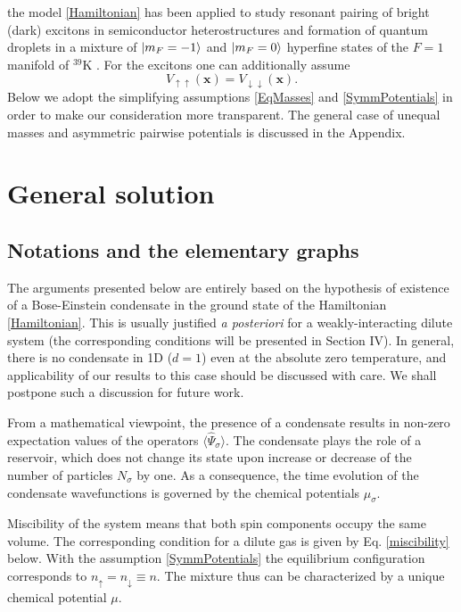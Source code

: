\documentclass[reprint,superscriptaddress,showpacs,nofootinbib,aps,pra]{revtex4-1}
\begin{document}
the model \eqref{Hamiltonian} has been applied to study resonant pairing of bright (dark) excitons in semiconductor heterostructures \cite{ResonantPairing} and formation of quantum droplets in a mixture of $\ket{m_F=-1}$ and $\ket{m_F=0}$ hyperfine states of the $F=1$ manifold of $^{39}$K \cite{Petrov2015, BoseMixture}. For the excitons one can additionally assume 
\begin{equation}
\label{SymmPotentials}
V_{\uparrow\uparrow}(\bm x)=V_{\downarrow\downarrow}(\bm x).
\end{equation}
Below we adopt the simplifying assumptions \eqref{EqMasses} and \eqref{SymmPotentials} in order to make our consideration more transparent. The general case of unequal masses and asymmetric pairwise potentials is discussed in the Appendix.

\section{General solution}

\subsection{Notations and the elementary graphs}

The arguments presented below are entirely based on the hypothesis of existence of a Bose-Einstein condensate in the ground state of the Hamiltonian \eqref{Hamiltonian}. This is usually justified \textit{a posteriori} for a weakly-interacting dilute system (the corresponding conditions will be presented in Section IV). In general, there is no condensate in 1D ($d=1$) even at the absolute zero temperature, and applicability of our results to this case should be discussed with care. We shall postpone such a discussion for future work.   

From a mathematical viewpoint, the presence of a condensate results in non-zero expectation values of the operators $\langle\hat \Psi_\sigma\rangle$. The condensate plays the role of a reservoir, which does not change its state upon increase or decrease of the number of particles $N_\sigma$ by one. As a consequence, the time evolution of the condensate wavefunctions is governed by the chemical potentials $\mu_\sigma$.   

Miscibility of the system means that both spin components occupy the same volume. The corresponding condition for a dilute gas is given by Eq. \eqref{miscibility} below. With the assumption \eqref{SymmPotentials} the equilibrium configuration corresponds to $n_\uparrow=n_\downarrow\equiv n$. The mixture thus can be characterized by a unique chemical potential $\mu$. 
\end{document}
